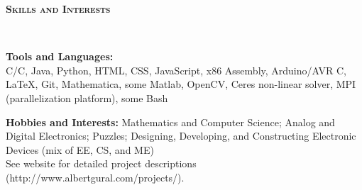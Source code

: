 \documentclass{article}
\newenvironment{changemargin}[2]{%
  \begin{list}{}{%
    \setlength{\topsep}{0pt}%
    \setlength{\leftmargin}{#1}%
    \setlength{\rightmargin}{#2}%
    \setlength{\listparindent}{\parindent}%
    \setlength{\itemindent}{\parindent}%
    \setlength{\parsep}{\parskip}%
  }%
  \item[]}{\end{list}
}
\newcommand{\lineover}{
	\begin{changemargin}{-0.05in}{-0.05in}
		\vspace*{-8pt}
		\hrulefill \\
		\vspace*{-2pt}
	\end{changemargin}
}
\newcommand{\header}[1]{
	\begin{changemargin}{-0.5in}{-0.5in}
		{\large \textbf{\scshape{#1}}}\\
  	\lineover
	\end{changemargin}
}
\newenvironment{body} {
	\vspace*{-16pt}
	\begin{changemargin}{-0.25in}{-0.5in}
  }	
	{\end{changemargin}
}
\newcommand{\CC}{C\nolinebreak\hspace{-.05em}\raisebox{.4ex}{\tiny\bf +}\nolinebreak\hspace{-.10em}\raisebox{.4ex}{\tiny\bf +}}
\begin{document}
\smallskip


\header{Skills and Interests}

\begin{body}
	\vspace{14pt}
	\textbf{Tools and Languages:} \\
	C/\CC, Java, Python, HTML, CSS, JavaScript, x86 Assembly, Arduino/AVR C, \LaTeX, Git, Mathematica, some Matlab, OpenCV, Ceres non-linear solver, MPI (parallelization platform), some Bash \\
	
	\medskip
	
	\textbf{Hobbies and Interests:} Mathematics and Computer Science; Analog and Digital Electronics; Puzzles; Designing, Developing, and Constructing Electronic Devices (mix of EE, CS, and ME) \\ See website for detailed project descriptions (http://www.albertgural.com/projects/). \\
\end{body}

\smallskip
\end{document}
